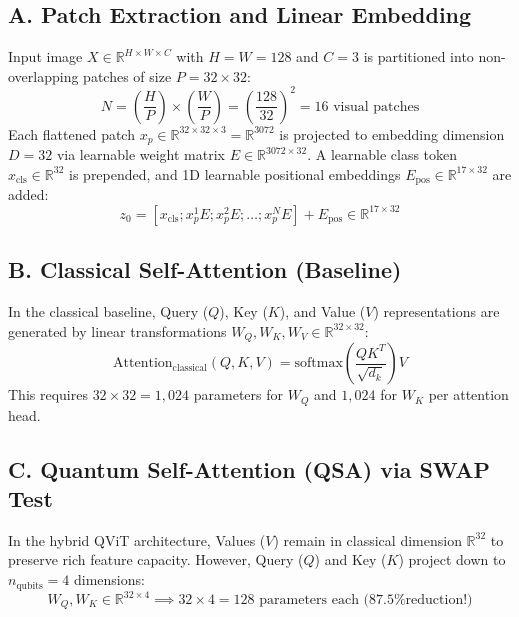 \documentclass[11pt,a4paper]{article}
\begin{document}
\subsection{A. Patch Extraction and Linear Embedding}
Input image $X \in \mathbb{R}^{H \times W \times C}$ with $H=W=128$ and $C=3$ is partitioned into non-overlapping patches of size $P = 32 \times 32$:
\begin{equation}
N = \left(\frac{H}{P}\right) \times \left(\frac{W}{P}\right) = \left(\frac{128}{32}\right)^2 = 16 \text{ visual patches}
\end{equation}
Each flattened patch $x_p \in \mathbb{R}^{32 \times 32 \times 3} = \mathbb{R}^{3072}$ is projected to embedding dimension $D = 32$ via learnable weight matrix $E \in \mathbb{R}^{3072 \times 32}$. A learnable class token $x_{\text{cls}} \in \mathbb{R}^{32}$ is prepended, and 1D learnable positional embeddings $E_{\text{pos}} \in \mathbb{R}^{17 \times 32}$ are added:
\begin{equation}
z_0 = [x_{\text{cls}}; x_p^1 E; x_p^2 E; \dots; x_p^N E] + E_{\text{pos}} \in \mathbb{R}^{17 \times 32}
\end{equation}

\subsection{B. Classical Self-Attention (Baseline)}
In the classical baseline, Query ($Q$), Key ($K$), and Value ($V$) representations are generated by linear transformations $W_Q, W_K, W_V \in \mathbb{R}^{32 \times 32}$:
\begin{equation}
\text{Attention}_{\text{classical}}(Q, K, V) = \text{softmax}\left(\frac{Q K^T}{\sqrt{d_k}}\right) V
\end{equation}
This requires $32 \times 32 = 1,024$ parameters for $W_Q$ and $1,024$ for $W_K$ per attention head.

\subsection{C. Quantum Self-Attention (QSA) via SWAP Test}
In the hybrid QViT architecture, Values ($V$) remain in classical dimension $\mathbb{R}^{32}$ to preserve rich feature capacity. However, Query ($Q$) and Key ($K$) project down to $n_{\text{qubits}} = 4$ dimensions:
\begin{equation}
W_Q, W_K \in \mathbb{R}^{32 \times 4} \implies 32 \times 4 = 128 \text{ parameters each (87.5\% reduction!)}
\end{equation}
\end{document}
